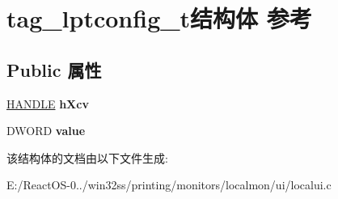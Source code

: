 \hypertarget{structtag__lptconfig__t}{}\section{tag\+\_\+lptconfig\+\_\+t结构体 参考}
\label{structtag__lptconfig__t}
\subsection*{Public 属性}
\begin{DoxyCompactItemize}
\item 
\mbox{\label{structtag__lptconfig__t_af97d5dbeb1bdea162c5eb594c8183d15}} 
\hyperlink{interfacevoid}{H\+A\+N\+D\+LE} {\bfseries h\+Xcv}
\item 
\mbox{\label{structtag__lptconfig__t_a0f2af3d6af930923668f3484efc93c76}} 
D\+W\+O\+RD {\bfseries value}
\end{DoxyCompactItemize}


该结构体的文档由以下文件生成\+:\begin{DoxyCompactItemize}
\item 
E\+:/\+React\+O\+S-\/0../win32ss/printing/monitors/localmon/ui/localui.\+c\end{DoxyCompactItemize}
